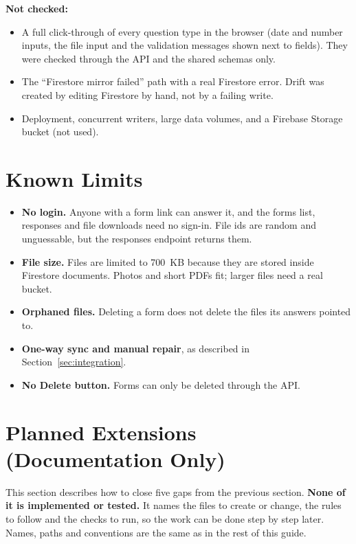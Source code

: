 \documentclass[11pt,a4paper]{article}
\begin{document}
\textbf{Not checked:}
\begin{itemize}
  \item A full click-through of every question type in the browser (date and number inputs, the file input and the validation messages shown next to fields). They were checked through the API and the shared schemas only.
  \item The ``Firestore mirror failed'' path with a real Firestore error. Drift was created by editing Firestore by hand, not by a failing write.
  \item Deployment, concurrent writers, large data volumes, and a Firebase Storage bucket (not used).
\end{itemize}

\section{Known Limits}
\begin{itemize}
  \item \textbf{No login.} Anyone with a form link can answer it, and the forms list, responses and file downloads need no sign-in. File ids are random and unguessable, but the responses endpoint returns them.
  \item \textbf{File size.} Files are limited to 700~KB because they are stored inside Firestore documents. Photos and short PDFs fit; larger files need a real bucket.
  \item \textbf{Orphaned files.} Deleting a form does not delete the files its answers pointed to.
  \item \textbf{One-way sync and manual repair}, as described in Section~\ref{sec:integration}.
  \item \textbf{No Delete button.} Forms can only be deleted through the API.
\end{itemize}


\clearpage
\section{Planned Extensions (Documentation Only)}\label{sec:extensions}
This section describes how to close five gaps from the previous section. \textbf{None of it is implemented or tested.} It names the files to create or change, the rules to follow and the checks to run, so the work can be done step by step later. Names, paths and conventions are the same as in the rest of this guide.
\end{document}
